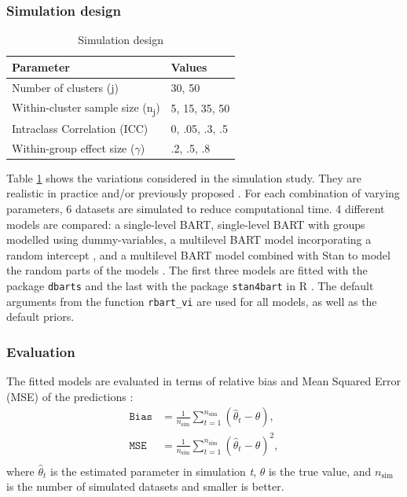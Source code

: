 \documentclass[10pt, a4paper, titlepage]{article}
\begin{document}
\subsubsection{Simulation design}
\begin{table}
\centering
\caption{Simulation design}
\label{tab:simulationparameters}
\begin{tabular}{l|l}
\textbf{Parameter}                                  & \textbf{Values} \\ \hline
Number of clusters (j)                              & 30, 50          \\
Within-cluster sample size (n\textsubscript{j})     & 5, 15, 35, 50   \\
Intraclass Correlation (ICC)                        & 0, .05, .3, .5  \\
Within-group effect size ($\gamma$)                 & .2, .5, .8
\end{tabular}
\end{table}

Table \ref{tab:simulationparameters} shows the variations considered in the simulation study. They are realistic in practice and/or previously proposed \citep{gulliford1999, murray2003, hox2017, grund2018, enders2018a, enders2020}. For each combination of varying parameters, 6 datasets are simulated to reduce computational time. 4 different models are compared: a single-level BART, single-level BART with groups modelled using dummy-variables, a multilevel BART model incorporating a random intercept \citep{chen2020, wagner2020, tan2016, wundervald2022}, and a multilevel BART model combined with Stan to model the random parts of the models \citep{dorie2022}. The first three models are fitted with the package \texttt{dbarts} \citep{dorie2023} and the last with the package \texttt{stan4bart} \citep{dorie2023a} in R \citep{rcoreteam2023}. The default arguments from the function \texttt{rbart\_vi} are used for all models, as well as the default priors.

\subsubsection{Evaluation}
The fitted models are evaluated in terms of relative bias and Mean Squared Error (MSE) of the predictions \citep{morris2019}:
\begin{subequations}
\label{eq:evaluations}
\begin{align}
\texttt{Bias} &= \frac{1}{n_{\text{sim}}} \sum_{t=1}^{n_{\text{sim}}} (\hat{\theta}_t - \theta), \tag{5} \\
\texttt{MSE} &= \frac{1}{n_{\text{sim}}} \sum_{t=1}^{n_{\text{sim}}} (\hat{\theta}_t - \theta)^{2}, \tag{6} \\
\end{align}
\end{subequations}
where $\hat{\theta}_t$ is the estimated parameter in simulation \textit{t}, $\theta$ is the true value, and $n_{\text{sim}}$ is the number of simulated datasets and smaller is better.
\end{document}

